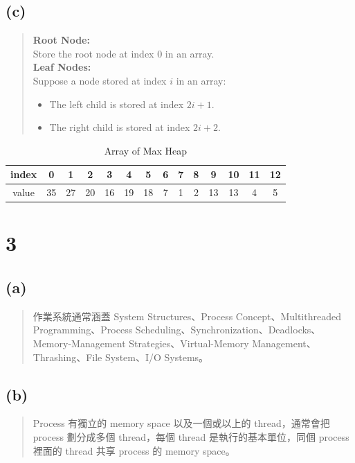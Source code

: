 \documentclass{article}
\begin{document}
\subsection*{(c)}
\begin{quote}
\begin{minipage}{\textwidth}
\textbf{Root Node:} \\
Store the root node at index 0 in an array.\\[10pt]

\textbf{Leaf Nodes:} \\
Suppose a node stored at index \( i \) in an array:
\begin{itemize}
    \item The left child is stored at index \( 2i+1 \).
    \item The right child is stored at index \( 2i+2 \).
\end{itemize}
\end{minipage}
\end{quote}
\begin{table}[h!]
\centering
\begin{tabular}{|c|c|c|c|c|c|c|c|c|c|c|c|c|c|}
\hline
index & 0 & 1 & 2 & 3 & 4 & 5 & 6 & 7 & 8 & 9 & 10 & 11 & 12 \\ \hline
value & 35 & 27 & 20 & 16 & 19 & 18 & 7 & 1 & 2 & 13 & 13 & 4 & 5 \\ \hline
\end{tabular}
\caption{Array of Max Heap}
\label{tab:example}
\end{table}




\section*{3}
\subsection*{(a)}
\begin{quote}
作業系統通常涵蓋 System Structures、Process Concept、Multithreaded Programming、Process Scheduling、Synchronization、Deadlocks、Memory-Management Strategies、Virtual-Memory Management、Thrashing、File System、I/O Systems。
\end{quote}

\subsection*{(b)}
\begin{quote}
Process 有獨立的 memory space 以及一個或以上的 thread，通常會把 process 劃分成多個 thread，每個 thread 是執行的基本單位，同個 process 裡面的 thread 共享 process 的 memory space。
\end{quote}
\end{document}
